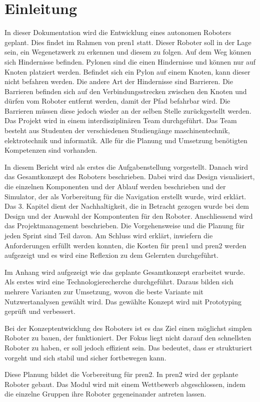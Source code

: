 \section{Einleitung}

In dieser Dokumentation wird die Entwicklung eines autonomen Roboters geplant. Dies findet im Rahmen von \acrfull{pren1} statt. Dieser Roboter soll in der Lage sein, ein Wegenetzwerk zu erkennen und diesem zu folgen. Auf dem Weg können sich Hindernisse befinden. Pylonen sind die einen Hindernisse und können nur auf Knoten platziert werden. Befindet sich ein Pylon auf einem Knoten, kann dieser nicht befahren werden. Die andere Art der Hindernisse sind Barrieren. Die Barrieren befinden sich auf den Verbindungsstrecken zwischen den Knoten und dürfen vom Roboter entfernt werden, damit der Pfad befahrbar wird. Die Barrieren müssen diese jedoch wieder an der selben Stelle zurückgestellt werden.
Das Projekt wird in einem interdisziplinären Team durchgeführt. Das Team besteht aus Studenten der verschiedenen Studiengänge \acrfull{maschinentechnik}, \acrfull{elektrotechnik} und \acrfull{informatik}. Alle für die Planung und Umsetzung benötigten Kompetenzen sind vorhanden.

In diesem Bericht wird als erstes die Aufgabenstellung vorgestellt. Danach wird das Gesamtkonzept des Roboters beschrieben. Dabei wird das Design visualisiert, die einzelnen Komponenten und der Ablauf werden beschrieben und der Simulator, der als Vorbereitung für die Navigation erstellt wurde, wird erklärt. Das 3. Kapitel dient der Nachhaltigkeit, die in Betracht gezogen wurde bei dem Design und der Auswahl der Kompontenten für den Roboter. Anschliessend wird das Projektmanagement beschrieben. Die Vorgehensweise und die Planung für jeden Sprint sind Teil davon.
Am Schluss wird erklärt, inwiefern die Anforderungen erfüllt werden konnten, die Kosten für \acrfull{pren1} und \acrfull{pren2} werden aufgezeigt und es wird eine Reflexion zu dem Gelernten durchgeführt.

Im Anhang wird aufgezeigt wie das geplante Gesamtkonzept erarbeitet wurde. Als erstes wird eine Technologierecherche durchgeführt. Daraus bilden sich mehrere Varianten zur Umsetzung, wovon die beste Variante mit Nutzwertanalysen gewählt wird. Das gewählte Konzept wird mit Prototyping geprüft und verbessert.

Bei der Konzeptentwicklung des Roboters ist es das Ziel einen möglichst simplen Roboter zu bauen, der funktioniert. Der Fokus liegt nicht darauf den schnellsten Roboter zu haben, er soll jedoch effizient sein. Das bedeutet, dass er strukturiert vorgeht und sich stabil und sicher fortbewegen kann.

Diese Planung bildet die Vorbereitung für \acrshort{pren2}. In \acrshort{pren2} wird der geplante Roboter gebaut. Das Modul wird mit einem Wettbewerb abgeschlossen, indem die einzelne Gruppen ihre Roboter gegeneinander antreten lassen.

